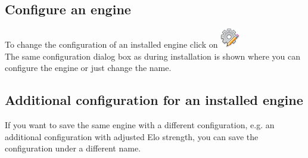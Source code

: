 \documentclass[11pt,a4paper]{article}
\begin{document}
	
	\subsection{Configure an engine}
	
	To change the configuration of an installed engine click on \includegraphics[scale=0.5]{cog_edit.png}\\
	The same configuration dialog box as during installation is shown where you can configure the engine or just change the name.
	
	\subsection{Additional configuration for an installed engine}
	
	If you want to save the same engine with a different configuration, e.g. an additional configuration with adjusted Elo strength, you can save the configuration under a different name.
	
\end{document}
